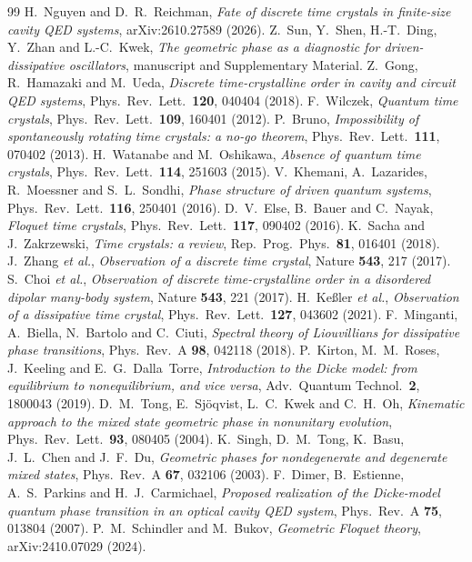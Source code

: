 \documentclass[11pt,a4paper]{article}
\begin{document}
\begin{thebibliography}{99}\small
{} H.~Nguyen and D.~R.~Reichman, \emph{Fate of discrete time crystals in finite-size cavity QED systems}, arXiv:2610.27589 (2026).
 Z.~Sun, Y.~Shen, H.-T.~Ding, Y.~Zhan and L.-C.~Kwek, \emph{The geometric phase as a diagnostic for driven-dissipative oscillators}, manuscript and Supplementary Material.
 Z.~Gong, R.~Hamazaki and M.~Ueda, \emph{Discrete time-crystalline order in cavity and circuit QED systems}, Phys.\ Rev.\ Lett.\ \textbf{120}, 040404 (2018).
 F.~Wilczek, \emph{Quantum time crystals}, Phys.\ Rev.\ Lett.\ \textbf{109}, 160401 (2012).
 P.~Bruno, \emph{Impossibility of spontaneously rotating time crystals: a no-go theorem}, Phys.\ Rev.\ Lett.\ \textbf{111}, 070402 (2013).
 H.~Watanabe and M.~Oshikawa, \emph{Absence of quantum time crystals}, Phys.\ Rev.\ Lett.\ \textbf{114}, 251603 (2015).
 V.~Khemani, A.~Lazarides, R.~Moessner and S.~L.~Sondhi, \emph{Phase structure of driven quantum systems}, Phys.\ Rev.\ Lett.\ \textbf{116}, 250401 (2016).
 D.~V.~Else, B.~Bauer and C.~Nayak, \emph{Floquet time crystals}, Phys.\ Rev.\ Lett.\ \textbf{117}, 090402 (2016).
 K.~Sacha and J.~Zakrzewski, \emph{Time crystals: a review}, Rep.\ Prog.\ Phys.\ \textbf{81}, 016401 (2018).
 J.~Zhang \emph{et al.}, \emph{Observation of a discrete time crystal}, Nature \textbf{543}, 217 (2017).
 S.~Choi \emph{et al.}, \emph{Observation of discrete time-crystalline order in a disordered dipolar many-body system}, Nature \textbf{543}, 221 (2017).
 H.~Ke{\ss}ler \emph{et al.}, \emph{Observation of a dissipative time crystal}, Phys.\ Rev.\ Lett.\ \textbf{127}, 043602 (2021).
 F.~Minganti, A.~Biella, N.~Bartolo and C.~Ciuti, \emph{Spectral theory of Liouvillians for dissipative phase transitions}, Phys.\ Rev.\ A \textbf{98}, 042118 (2018).
 P.~Kirton, M.~M.~Roses, J.~Keeling and E.~G.~Dalla~Torre, \emph{Introduction to the Dicke model: from equilibrium to nonequilibrium, and vice versa}, Adv.\ Quantum Technol.\ \textbf{2}, 1800043 (2019).
 D.~M.~Tong, E.~Sj\"oqvist, L.~C.~Kwek and C.~H.~Oh, \emph{Kinematic approach to the mixed state geometric phase in nonunitary evolution}, Phys.\ Rev.\ Lett.\ \textbf{93}, 080405 (2004).
 K.~Singh, D.~M.~Tong, K.~Basu, J.~L.~Chen and J.~F.~Du, \emph{Geometric phases for nondegenerate and degenerate mixed states}, Phys.\ Rev.\ A \textbf{67}, 032106 (2003).
 F.~Dimer, B.~Estienne, A.~S.~Parkins and H.~J.~Carmichael, \emph{Proposed realization of the Dicke-model quantum phase transition in an optical cavity QED system}, Phys.\ Rev.\ A \textbf{75}, 013804 (2007).
 P.~M.~Schindler and M.~Bukov, \emph{Geometric Floquet theory}, arXiv:2410.07029 (2024).
\end{thebibliography}
\end{document}
